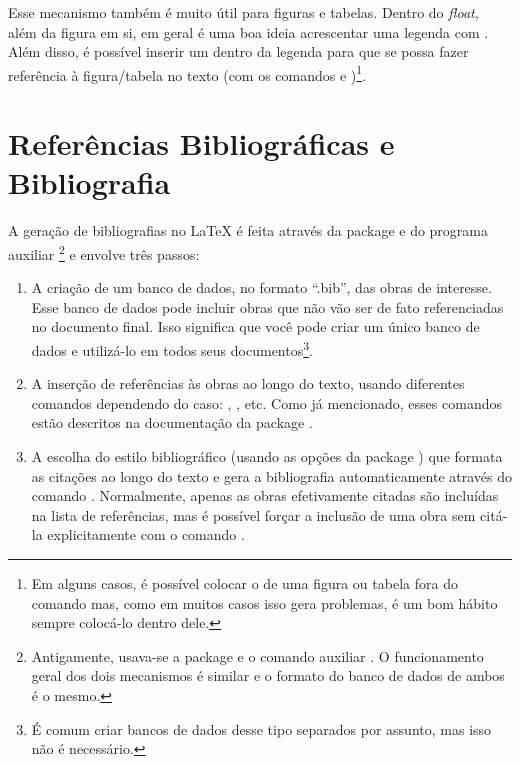 Esse mecanismo também é muito útil para figuras e tabelas. Dentro do
\emph{float}, além da figura em si, em geral é uma boa ideia acrescentar
uma legenda com . Além disso, é possível
inserir um  dentro da legenda para que se possa fazer
referência à figura/tabela no texto (com os comandos  e
)\footnote{Em alguns casos, é possível colocar o
 de uma figura ou tabela fora do comando 
mas, como em muitos casos isso gera problemas, é um bom hábito sempre
colocá-lo dentro dele.}.


\section{Referências Bibliográficas e Bibliografia}

\enlargethispage{-.5\baselineskip}

A geração de bibliografias no \LaTeX{} é feita através da package
 e do programa auxiliar
\footnote{Antigamente, usava-se a package
 e o comando auxiliar .
O funcionamento geral dos dois mecanismos é similar e o formato do banco
de dados de ambos é o mesmo.} e envolve três passos:

\begin{enumerate}
\item A criação de um banco de dados, no formato ``.bib'', das obras de
interesse. Esse banco de dados pode incluir obras que não vão ser de fato
referenciadas no documento final. Isso significa que você pode criar um
único banco de dados e utilizá-lo em todos seus documentos\footnote{É
comum criar bancos de dados desse tipo separados por assunto, mas isso
não é necessário.}.

\item A inserção de referências às obras ao longo do texto, usando
diferentes comandos dependendo do caso: , ,
 etc. Como já mencionado, esses comandos estão descritos
na documentação da package  \citep{natbib}.

\item A escolha do estilo bibliográfico (usando as opções da package
) que formata as citações ao longo do texto e gera a bibliografia
automaticamente através do comando .  Normalmente,
apenas as obras efetivamente citadas são incluídas na lista de referências,
mas é possível forçar a inclusão de uma obra sem citá-la explicitamente com
o comando .
\end{enumerate}

